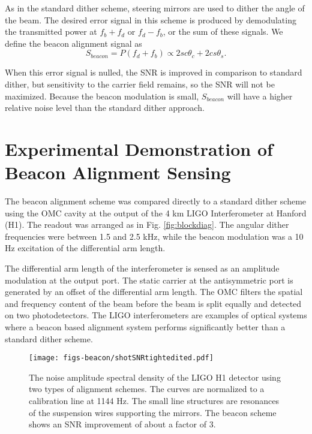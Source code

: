 As in the standard dither scheme, steering mirrors are used to dither the angle of the beam. %
The desired error signal in this scheme is produced by demodulating the transmitted power at $f_b+f_d$ or $f_d-f_b$, or the sum of these signals. %
We define the beacon alignment signal as
%
\begin{equation}
\label{eq:sbeacon}
S_{beacon}=P(f_d+f_b) \propto 2sc\theta_c+2cs\theta_s.
\end{equation}
%

When this error signal is nulled, the SNR is improved in comparison to standard dither, but sensitivity to the carrier field remains, so the SNR will not be maximized. %
Because the beacon modulation is small, $S_{beacon}$ will have a higher relative noise level than the standard dither approach.

\section{Experimental Demonstration of Beacon Alignment Sensing}
%


The beacon alignment scheme was compared directly to a standard dither scheme using the OMC cavity at the output of the 4 km LIGO Interferometer at Hanford (H1). %
The readout was arranged as in Fig. %
\ref{fig:blockdiag}. %
The angular dither frequencies were between 1.5 and 2.5 kHz, while the beacon modulation was a 10 Hz excitation of the differential arm length. %


The differential arm length of the interferometer is sensed as an amplitude modulation at the output port. %
The static carrier at the antisymmetric port is generated by an offset of the differential arm length. %
The OMC filters the spatial and frequency content of the beam before the beam is split equally and detected on two photodetectors. %
The LIGO interferometers are examples of optical systems where a beacon based alignment system performs significantly better than a standard dither scheme. %


%
\begin{figure}
  \begin{center}
  \leavevmode
  \texttt{[image: figs-beacon/shotSNRtightedited.pdf]}
  \end{center}
  \caption[An instance of the noise performance of beacon alignment sensing.]{The noise amplitude spectral density of the LIGO H1 detector using two types of alignment schemes. The curves are normalized to a calibration line at 1144 Hz.  The small line structures are resonances of the suspension wires supporting the mirrors. The beacon scheme shows an SNR improvement of about a factor of 3.}
  \label{fig:shotnoise}
\end{figure}

